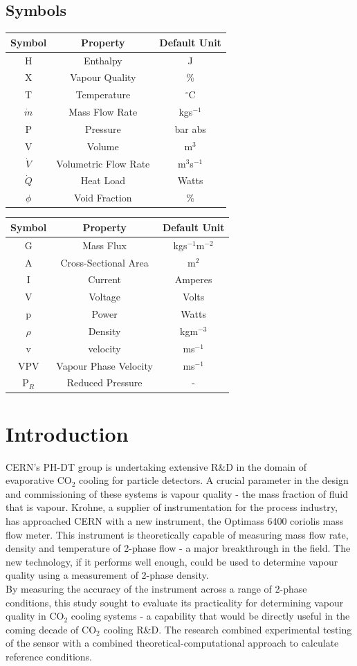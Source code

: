 \documentclass{report}
\begin{document}
\section*{Symbols}
\begin{tabular}{|c c c|}
\hline
\textbf{Symbol} & \textbf{Property} & \textbf{Default Unit} \\\hline
H & Enthalpy & J \\
X & Vapour Quality & \% \\
T & Temperature & $^\circ$C\\
$\dot{m}$ & Mass Flow Rate & kgs$^{-1}$ \\
P & Pressure & bar abs \\
V & Volume & m$^3$ \\
$\dot{V}$ & Volumetric Flow Rate & m$^3$s$^{-1}$\\
$\dot{Q}$ & Heat Load & Watts \\
$\phi$ & Void Fraction & \% \\\hline
\end{tabular}
\begin{tabular}{|c c c|}
\hline
\textbf{Symbol} & \textbf{Property} & \textbf{Default Unit} \\\hline
G & Mass Flux & kgs$^{-1}$m$^{-2}$\\
A & Cross-Sectional Area & m$^2$\\
I & Current & Amperes \\
V & Voltage & Volts \\
p & Power & Watts \\
$\rho$ & Density & kgm$^{-3}$\\
v & velocity &  ms$^{-1}$\\
VPV & Vapour Phase Velocity & ms$^{-1}$\\
P$_R$ &Reduced Pressure & -\\\hline
\end{tabular}
\tableofcontents
\chapter{Introduction}
\doublespacing
CERN's PH-DT group is undertaking extensive R\&\ignorespaces D in the domain of evaporative CO$_2$ cooling for particle detectors. A crucial parameter in the design and commissioning of these systems is vapour quality - the mass fraction of fluid that is vapour. Krohne, a supplier of instrumentation for the process industry, has approached CERN with a new instrument, the Optimass 6400 coriolis mass flow meter. This instrument is theoretically capable of measuring mass flow rate, density and temperature of 2-phase flow - a major breakthrough  in the field. The new technology, if it performs well enough, could be used to determine vapour quality using a measurement of 2-phase density. \\
By measuring the accuracy of the instrument across a range of 2-phase conditions, this study sought to evaluate its practicality for determining vapour quality in CO$_2$ cooling systems - a capability that would be directly useful in the coming decade of CO$_2$ cooling R\&\ignorespaces D. The research combined experimental testing of the sensor with a combined theoretical-computational approach to calculate reference conditions.
\FloatBarrier
\end{document}
